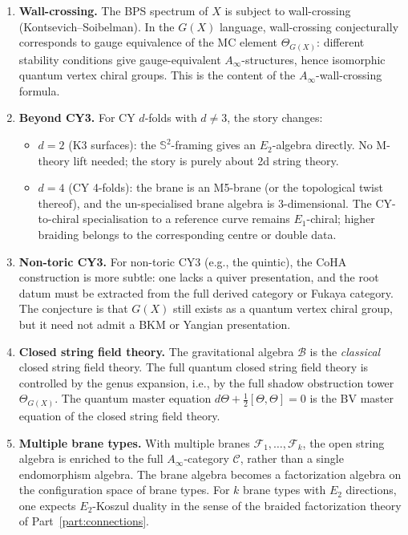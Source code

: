 \documentclass[11pt]{article}
\theoremstyle{definition}
\theoremstyle{remark}
\newcommand{\Ainf}{A_\infty}
\newcommand{\cB}{\mathcal{B}}
\newcommand{\cC}{\mathcal{C}}
\newcommand{\cF}{\mathcal{F}}
\newcommand{\Eone}{E_1}
\begin{document}
\begin{enumerate}[label=(\arabic*)]
 \item \textbf{Wall-crossing.} The BPS spectrum of $X$ is subject to
 wall-crossing (Kontsevich--Soibelman). In the $G(X)$ language,
 wall-crossing conjecturally corresponds to gauge equivalence of the MC element
 $\Theta_{G(X)}$: different stability conditions give gauge-equivalent
 $\Ainf$-structures, hence isomorphic quantum vertex chiral groups. This
 is the content of the $\Ainf$-wall-crossing formula.

 \item \textbf{Beyond CY3.} For CY $d$-folds with $d \neq 3$, the story
 changes:
 \begin{itemize}
 \item $d = 2$ (K3 surfaces): the $\mathbb{S}^2$-framing gives an
 $E_2$-algebra directly. No M-theory lift needed; the story is purely
 about 2d string theory.
 \item $d = 4$ (CY 4-folds): the brane is an M5-brane (or the
 topological twist thereof), and the un-specialised brane algebra is
 3-dimensional. The CY-to-chiral specialisation to a reference curve remains
 $\Eone$-chiral; higher braiding belongs to the corresponding centre or
 double data.
 \end{itemize}

 \item \textbf{Non-toric CY3.} For non-toric CY3 (e.g., the quintic), the
 CoHA construction is more subtle: one lacks a quiver presentation, and the
 root datum must be extracted from the full derived category or Fukaya
 category. The conjecture is that $G(X)$ still exists as a quantum vertex
 chiral group, but it need not admit a BKM or Yangian presentation.

 \item \textbf{Closed string field theory.} The gravitational algebra $\cB$
 is the \emph{classical} closed string field theory. The full quantum
 closed string field theory is controlled by the genus expansion, i.e., by
 the full shadow obstruction tower $\Theta_{G(X)}$. The quantum master equation
 $d\Theta + \frac{1}{2}[\Theta, \Theta] = 0$ is the BV master equation of
 the closed string field theory.

 \item \textbf{Multiple brane types.} With multiple branes $\cF_1, \ldots,
 \cF_k$, the open string algebra is enriched to the full $\Ainf$-category
 $\cC$, rather than a single endomorphism algebra. The brane algebra becomes a
 factorization algebra on the configuration space of brane types. For $k$
 brane types with $E_2$ directions, one expects $E_2$-Koszul duality in the
 sense of the braided factorization theory of Part~\ref{part:connections}.
\end{enumerate}
\end{document}
